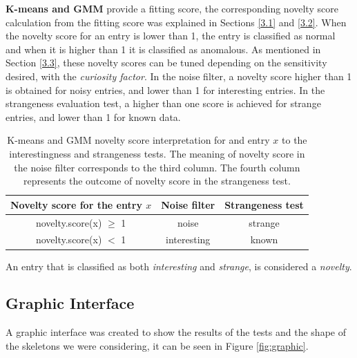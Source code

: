\textbf{K-means and GMM} provide a fitting score, the corresponding novelty score calculation from the fitting score was explained in Sections \ref{3.1} and \ref{3.2}. When the novelty score for an entry is lower than 1, the entry is classified as normal and when it is higher than 1 it is classified as anomalous. As mentioned in Section \ref{3.3}, these novelty scores can be tuned depending on the sensitivity desired, with the \emph{curiosity factor}. In the noise filter, a novelty score higher than 1 is obtained for noisy entries, and lower than 1 for interesting entries. In the strangeness evaluation test, a higher than one score is achieved for strange entries, and lower than 1 for known data.

\begin{table}[h]
    \begin{tabular}{ c c c}
    \hline
    Novelty score for the entry $x$ & Noise filter & Strangeness test \\ 
    \hline
    novelty.score(x) $\geq$ 1 & noise & strange \\
    novelty.score(x) $<$ 1 & interesting & known \\
    \hline
    \end{tabular}
    \centering
    \caption[K-means and GMM novelty score interpretation]{K-means and GMM novelty score interpretation for and entry $x$ to the interestingness and strangeness tests. The meaning of novelty score in the noise filter corresponds to the third column. The fourth column represents the outcome of novelty score in the strangeness test.}
\end{table}

An entry that is classified as both \emph{interesting} and \emph{strange}, is considered a \emph{novelty}.

\subsection{Graphic Interface}

A graphic interface was created to show the results of the tests and the shape of the skeletons we were considering, it can be seen in Figure \ref{fig:graphic}.

